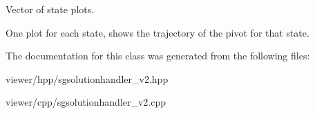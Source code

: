 Vector of state plots. 

One plot for each state, shows the trajectory of the pivot for that state. 

The documentation for this class was generated from the following files\+:\begin{DoxyCompactItemize}
\item 
viewer/hpp/sgsolutionhandler\+\_\+v2.\+hpp\item 
viewer/cpp/sgsolutionhandler\+\_\+v2.\+cpp\end{DoxyCompactItemize}
